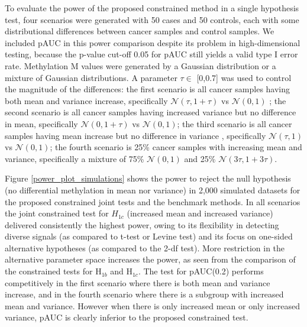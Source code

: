 \documentclass{statsoc}
\begin{document}
To evaluate the power of the proposed constrained method in a single hypothesis test, four scenarios were generated with 50 cases and 50 controls, each with some distributional differences between cancer samples and control samples. We included pAUC in this power comparison despite its problem in high-dimensional testing, because the p-value cut-off 0.05 for pAUC still yields a valid type I error rate. Methylation M values were generated by a Gaussian distribution or a mixture of Gaussian distributions. A parameter $\tau \in$ [0,0.7] was used to control the magnitude of the differences:  the first scenario is all cancer samples having both mean and variance increase, specifically $\mathcal{N}(\tau,1+\tau)$ vs $\mathcal{N}(0,1)$ ; the second scenario is all cancer samples having increased variance but no difference in mean, specifically $\mathcal{N}(0,1+\tau)$ vs $\mathcal{N}(0,1)$; the third scenario is all cancer samples having mean increase but no difference in variance , specifically $\mathcal{N}(\tau,1)$ vs $\mathcal{N}(0,1)$; the fourth scenario is 25\% cancer samples with increasing mean and variance, specifically a mixture of 75\% $\mathcal{N}(0,1)$ and 25\%  $\mathcal{N}(3\tau,1+3\tau)$.


Figure \ref{power_plot_simulations} shows the power to reject the null hypothesis (no differential methylation in mean nor variance) in 2,000 simulated datasets for the proposed constrained joint tests and the benchmark methods. In all scenarios the joint constrained test for $H_{1c}$ (increased mean and increased variance) delivered consistently the highest power, owing to its flexibility in detecting diverse signals (as compared to t-test or Levine test) and its focus on one-sided alternative hypotheses (as compared to the 2-df test). More restriction in the alternative parameter space increases the power, as seen from the comparison of the constrained tests for H$_{1b}$ and H$_{1c}$. The test for pAUC(0.2) performs competitively in the first scenario where there is both mean and variance increase, and in the fourth scenario where there is a subgroup with increased mean and variance. However when there is only increased mean or only increased variance, pAUC is clearly inferior to the proposed constrained test.
\end{document}
